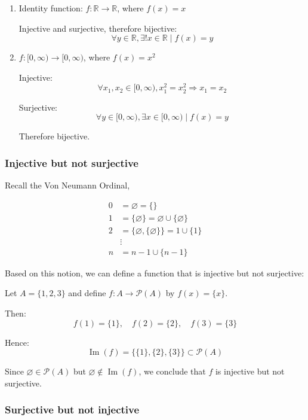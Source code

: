 \documentclass[12pt,a4paper,openany]{article}
\begin{document}
\begin{enumerate}
\item Identity function: $f : \mathbb{R} \to \mathbb{R}$, where $f(x) = x$

   Injective and surjective, therefore bijective:
   \[\forall y \in \mathbb{R}, \exists! x \in \mathbb{R} \mid f(x) = y\]


\item $f : [0, \infty) \to [0, \infty)$, where $f(x) = x^2$

   Injective: \[\forall x_1, x_2 \in [0, \infty), x_1^2 = x_2^2 \Longrightarrow x_1 = x_2\]

   Surjective: \[\forall y \in [0, \infty), \exists x \in [0, \infty) \mid f(x) = y\]

   Therefore bijective.
\end{enumerate}

\subsubsection{Injective but not surjective}

Recall the Von Neumann Ordinal, 

\[\begin{aligned}
   0 &= \varnothing = \{\}\\
   1 &= \{\varnothing\} = \varnothing \cup \{\varnothing\}\\
   2 &= \{\varnothing, \{\varnothing\}\} = 1 \cup \{1\}\\
   &\vdots\\
   n &= n-1 \cup \{n-1\}
\end{aligned}
\]

Based on this notion, we can define a function that is injective but not surjective:

Let $A = \{1, 2, 3\}$ and define $f: A \to \mathcal{P}(A)$ by $f(x) = \{x\}$.

Then:
\[f(1) = \{1\}, \quad f(2) = \{2\}, \quad f(3) = \{3\}\]

Hence:
\[\operatorname{Im}(f) = \{\{1\}, \{2\}, \{3\}\} \subset \mathcal{P}(A)\]

Since $\varnothing \in \mathcal{P}(A)$ but $\varnothing \notin \operatorname{Im}(f)$, we conclude that $f$ is injective but not surjective.

\subsubsection{Surjective but not injective}
\end{document}
